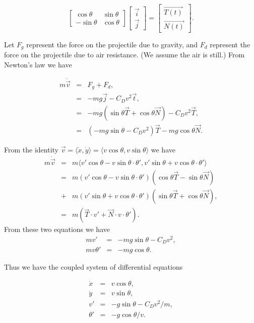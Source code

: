 \[
\left[\begin{array}{cc}\cos{\theta} & \sin{\theta} \\-\sin{\theta} & \cos{\theta}\end{array}\right] \left[\begin{array}{c}\vec{i} \\\vec{j}\end{array}\right] = \left[\begin{array}{c}\vec{T(t)} \\\vec{N(t)}\end{array}\right]
.\]




Let $F_g$ represent the force on the projectile due to gravity, and $F_d$ represent the force on the projectile due to air resistance. (We assume the air is still.) From Newton's law we have

\begin{eqnarray*}
m \dot{\vec{v}} &=& F_g + F_d , \\
&=& -mg \vec{j} - C_Dv^2 \vec{t},\\
&=& -mg( \sin{\theta} \vec{T} + \cos{\theta} \vec{N} ) - C_D v^2 \vec{T},\\
&=& (-mg \sin{\theta} - C_D v^2 ) \vec{T} - mg \cos{\theta} \vec{N}.
\end{eqnarray*}

From the identity 
$\vec{v} = \langle \dot{x}, \dot{y} \rangle = \langle v \cos{\theta}, v \sin{\theta} \rangle$ 
we have 
\begin{eqnarray*}
m \dot{\vec{v}} &=& m\langle v' \cos{\theta} - v\sin{\theta} \cdot \theta' ,v'\sin{\theta} + v\cos{\theta} \cdot \theta' \rangle \\
&=& m(v'\cos{\theta} - v\sin{\theta} \cdot \theta')(\cos{\theta} \vec{T} - \sin{\theta}\vec{N}) \\
&+& m(v' \sin{\theta} + v\cos{\theta} \cdot \theta')( \sin{\theta} \vec{T} + \cos{\theta} \vec{N})  ,\\
&=& m(\vec{T} \cdot v' + \vec{N} \cdot v \cdot \theta') .
\end{eqnarray*}
From these two equations we have 
\begin{eqnarray*}
mv' &=& -mg\sin{\theta} - C_D v^2,\\
mv\theta' &=& -mg \cos{\theta}.
\end{eqnarray*}


Thus we have the coupled system of differential equations

\begin{eqnarray*}
\dot{x} &=& v\cos{\theta},\\
\dot{y} &=& v\sin{\theta},\\
v' &=& -g\sin{\theta} - C_D v^2/m,\\
\theta' &=& -g \cos{\theta}/v.
\end{eqnarray*}

